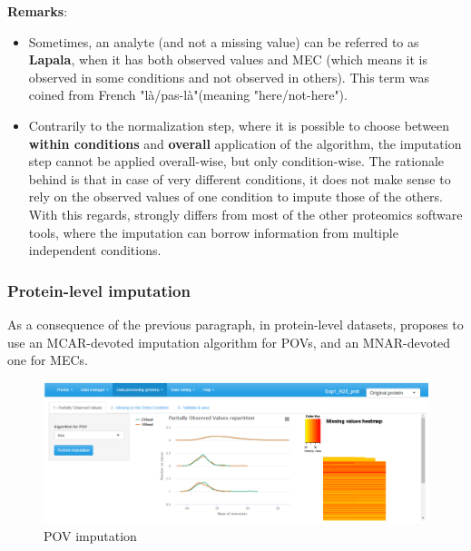 \documentclass[12pt]{article}
\begin{document}
\textbf{Remarks}: 
\begin{itemize}
	\item Sometimes, an analyte (and not a missing value) can be referred to as \textbf{Lapala}, when it has both observed values and MEC (which means it is observed in some conditions and not observed in others). This term was coined from French "l\`a/pas-l\`a"(meaning "here/not-here").
	\item Contrarily to the normalization step, where it is possible to choose between \textbf{within conditions} and \textbf{overall} application of the algorithm, the imputation step cannot be applied overall-wise, but only condition-wise. The rationale behind is that in case of very different conditions, it does not make sense to rely on the observed values of one condition to impute those of the others. With this regards,  strongly differs from most of the other proteomics software tools, where the imputation can borrow information from multiple independent conditions.
\end{itemize}
 
\subsubsection{Protein-level imputation}\label{sec:proteinimputation}
As a consequence of the previous paragraph, in protein-level datasets,  proposes to use an MCAR-devoted imputation algorithm for POVs, and an MNAR-devoted one for MECs.

\begin {figure}
\includegraphics[width=\textwidth]{images/protein-POV.png}
\caption{POV imputation}\label{fig:prot-POV}
\end {figure}
\end{document}
